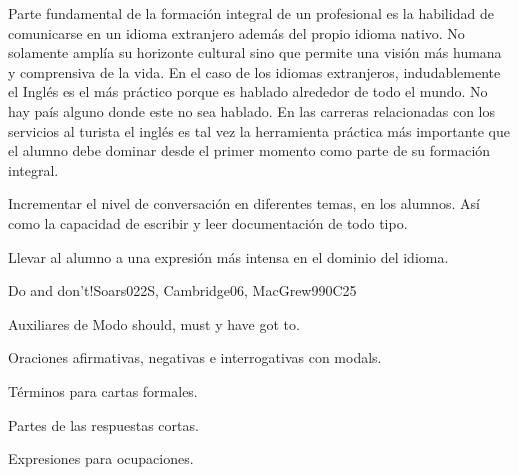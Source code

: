 \begin{syllabus}


\begin{justification}
Parte fundamental de la formación integral de un profesional es la habilidad de comunicarse en un idioma extranjero además del propio idioma nativo. No solamente amplía su horizonte cultural sino que permite una visión más humana y comprensiva de la vida. En el caso de los idiomas extranjeros, indudablemente el Inglés es el 
más práctico porque es hablado alrededor de todo el mundo. No hay país alguno donde este no sea hablado. En las carreras relacionadas con los servicios al turista el inglés es tal vez la herramienta práctica más importante que el alumno debe dominar desde el primer momento como parte de su formación integral.
\end{justification}

\begin{goals}
\item Incrementar el nivel de conversación en diferentes temas, en los alumnos. Así como la capacidad de escribir y leer documentación de todo tipo.
\item Llevar al alumno a una expresión  más intensa en el dominio del idioma.
\end{goals}

\begin{outcomes}
\item {}
\end{outcomes}

\begin{competences}
\item {}
\end{competences}

\begin{unit}{Do and don't!}{}{Soars022S, Cambridge06, MacGrew99}{0}{C25}
   \begin{topics}
      \item Auxiliares de Modo should, must y have got to.
      \item Oraciones afirmativas, negativas e interrogativas con modals.
      \item Términos para cartas formales.
      \item Partes de las respuestas cortas.
      \item Expresiones para ocupaciones.
   \end{topics}


\end{unit}
\end{syllabus}
